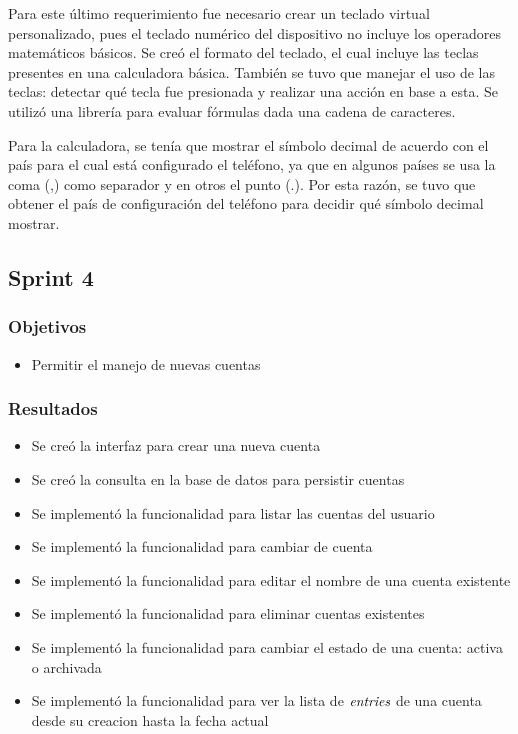Para este último requerimiento fue necesario crear un teclado virtual personalizado, pues el teclado numérico del dispositivo no incluye los operadores matemáticos básicos. Se creó el formato del teclado, el cual incluye las teclas presentes en una calculadora básica. También se tuvo que manejar el uso de las teclas: detectar qué tecla fue presionada y realizar una acción en base a esta. Se utilizó una librería para evaluar fórmulas dada una cadena de caracteres.

Para la calculadora, se tenía que mostrar el símbolo decimal de acuerdo con el país para el cual está configurado el teléfono, ya que en algunos países se usa la coma (,) como separador y en otros el punto (.). Por esta razón, se tuvo que obtener el país de configuración del teléfono para decidir qué símbolo decimal mostrar.



\subsection{Sprint 4}
\subsubsection{Objetivos}
\begin{itemize}
\item Permitir el manejo de nuevas cuentas
\end{itemize}

\subsubsection{Resultados}
\begin{itemize}

\item Se creó la interfaz para crear una nueva cuenta
\item Se creó la consulta en la base de datos para persistir cuentas
\item Se implementó la funcionalidad para listar las cuentas del usuario 
\item Se implementó la funcionalidad para cambiar de cuenta
\item Se implementó la funcionalidad para editar el nombre de una cuenta existente
\item Se implementó la funcionalidad para eliminar cuentas existentes
\item Se implementó la funcionalidad para cambiar el estado de una cuenta: activa o archivada
\item Se implementó la funcionalidad para ver la lista de $\textit{entries}$ de una cuenta desde su creacion hasta la fecha actual

\end{itemize}


